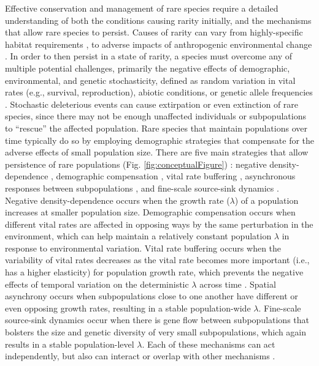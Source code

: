 \documentclass[12pt, letterpaper]{article}
\begin{document}
Effective conservation and management of rare species require a detailed understanding of both the conditions causing rarity initially, and the mechanisms that allow rare species to persist. Causes of rarity can vary from highly-specific habitat requirements \cite{Sgarbi2018YouTime}, to adverse impacts of anthropogenic environmental change \cite{Vincent2020-tz}. In order to then persist in a state of rarity, a species must overcome any of multiple potential challenges, primarily the negative effects of demographic, environmental, and genetic stochasticity, defined as random variation in vital rates (e.g., survival, reproduction), abiotic conditions, or genetic allele frequencies \cite{May1973StabilityEnvironments}. Stochastic deleterious events can cause extirpation or even extinction of rare species, since there may not be enough unaffected individuals or subpopulations to “rescue” the affected population\cite{Nei1975ThePopulations}. Rare species that maintain populations over time typically do so by employing demographic strategies that compensate for the adverse effects of small population size. There are five main strategies that allow persistence of rare populations (Fig. \ref{fig:conceptualFigure}) \cite{Dibner2019}: negative density-dependence \cite{Rovere2019PersistentlyAvoid}, demographic compensation \cite{Villellas2015DemographicImplications}, vital rate buffering \cite{Pfister1998PatternsImplications, Hilde2020TheChallenges}, asynchronous responses between subpopulations \cite{Abbott2017PortfolioWeberi}, and fine-scale source-sink dynamics \cite{Kauffman2004SpatialPopulation, Pulliam2016SourcesUse}. Negative density-dependence occurs when the growth rate ($\lambda$)  of a population increases at smaller population size. Demographic compensation occurs when different vital rates are affected in opposing ways by the same perturbation in the environment, which can help maintain a relatively constant population $\lambda$ in response to environmental variation. Vital rate buffering occurs when the variability of vital rates decreases as the vital rate becomes more important (i.e., has a higher elasticity) for population growth rate, which prevents the negative effects of temporal variation on the deterministic $\lambda$ across time \cite{Tuljapurkar1989An.}. Spatial asynchrony occurs when subpopulations close to one another have different or even opposing growth rates, resulting in a stable population-wide $\lambda$. Fine-scale source-sink dynamics occur when there is gene flow between subpopulations that bolsters the size and genetic diversity of very small subpopulations, which again results in a stable population-level $\lambda$. Each of these mechanisms can act independently, but also can interact or overlap with other mechanisms \cite{Dibner2019}.  
\end{document}
